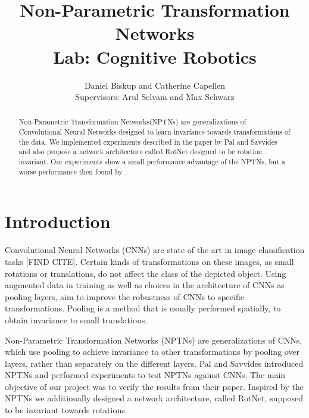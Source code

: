 \documentclass{llncs}
\begin{document}
\pagestyle{headings}  %
%
\mainmatter              %
%
\title{Non-Parametric Transformation Networks \\Lab: Cognitive Robotics}
%
%  
%
\author{Daniel Biskup and Catherine Capellen
 \\Supervisors: Arul Selvam and Max Schwarz}
%
%
%

\maketitle              %
\begin{abstract} Non-Parametric Transformation Networks(NPTNs) are generalizations of Convolutional Neural Networks designed to learn invariance towards transformations of the data. 
We implemented experiments described in the paper by Pal and Savvides \cite{NPTN18} and also propose a network architecture called RotNet designed to be rotation invariant. Our experiments show a small performance advantage of the NPTNs, but a worse performance then found by \cite{NPTN18}.

\end{abstract}
\section{Introduction}
Convolutional Neural Networks (CNNs) are state of the art in image classification tasks [FIND CITE]. Certain kinds of transformations on these images, as small rotations or translations, do not affect the class of the depicted object.  
Using augmented data in training as well as choices in the architecture of CNNs as pooling layers, aim to improve the robustness of CNNs to specific transformations. 
Pooling is a method that is usually performed spatially, to obtain invariance to small translations. 

Non-Parametric Transformation Networks (NPTNs) are generalizations of CNNs, which use pooling to achieve invariance to other transformations by pooling over layers, rather than separately on the different layers.
Pal and Savvides \cite{NPTN18} introduced NPTNs and performed experiments to test NPTNs against CNNs. The main objective of our project was to verify the results from their paper. 
Inspired by the NPTNs we additionally designed a network architecture, called RotNet, supposed to be invariant towards rotations.
\end{document}
